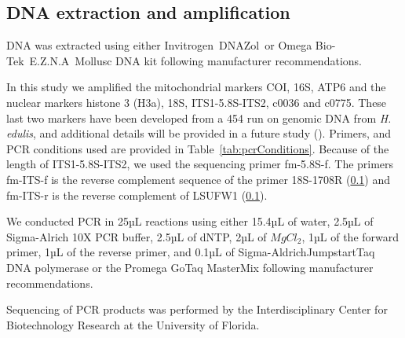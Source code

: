 \documentclass{article}\usepackage[]{graphicx}\usepackage[]{color}
\begin{document}

\subsection{DNA extraction and amplification}

DNA was extracted using either Invitrogen\texttrademark\ DNAZol\textregistered\
or Omega Bio-Tek\texttrademark\ E.Z.N.A\textregistered\ Mollusc DNA kit following
manufacturer recommendations. 

In this study we amplified the mitochondrial markers COI, 16S, ATP6 and the
nuclear markers histone 3 (H3a), 18S, ITS1-5.8S-ITS2, c0036 and c0775. These
last two markers have been developed from a 454 run on genomic DNA from
\textit{H. edulis}, and additional details will be provided in a future study
(\cite{MichonneauInPrep}). Primers, and PCR conditions used are provided in
Table~\ref{tab:pcrConditions}. Because of the length of ITS1-5.8S-ITS2, we used
the sequencing primer fm-5.8S-f. The primers fm-ITS-f is the reverse complement
sequence of the primer 18S-1708R (\ref{}) and fm-ITS-r is the reverse complement
of LSUFW1 (\ref{}).

We conducted PCR in 25µL reactions using either 15.4µL of water, 2.5µL of
Sigma-Alrich \textregistered 10X PCR buffer, 2.5µL of dNTP, 2µL of $MgCl_2$, 1µL
of the forward primer, 1µL of the reverse primer, and 0.1µL of
Sigma-Aldrich\textregistered Jumpstart\texttrademark Taq DNA polymerase or the
Promega GoTaq MasterMix following manufacturer recommendations.

Sequencing of PCR products was performed by the Interdisciplinary Center for
Biotechnology Research at the University of Florida.
\end{document}

